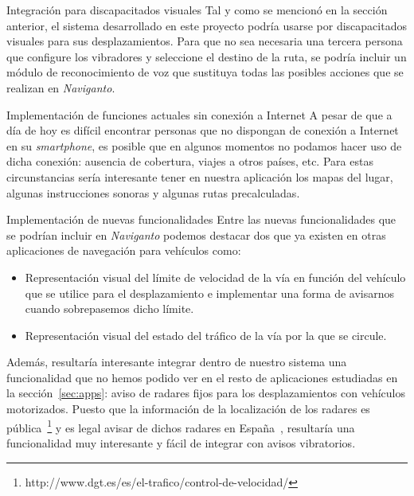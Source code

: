 \begin{definitionlist}
  \item[Integración para discapacitados visuales] Tal y como se mencionó en la sección anterior, el
    sistema desarrollado en este proyecto podría usarse por discapacitados visuales para sus
    desplazamientos. Para que no sea necesaria una tercera persona que configure los vibradores y
    seleccione el destino de la ruta, se podría incluir un módulo de reconocimiento de voz que
    sustituya todas las posibles acciones que se realizan en \emph{Naviganto}.

  \item[Implementación de funciones actuales sin conexión a Internet] A pesar de que a día de hoy es
    difícil encontrar personas que no dispongan de conexión a Internet en su \emph{smartphone}, es
    posible que en algunos momentos no podamos hacer uso de dicha conexión: ausencia de cobertura,
    viajes a otros países, etc. Para estas circunstancias sería interesante tener en nuestra
    aplicación los mapas del lugar, algunas instrucciones sonoras y algunas rutas precalculadas.

  \item[Implementación de nuevas funcionalidades] Entre las nuevas funcionalidades que se podrían
    incluir en \emph{Naviganto} podemos destacar dos que ya existen en otras aplicaciones de
    navegación para vehículos como:

    \begin{itemize}
      \item Representación visual del límite de velocidad de la vía en función del vehículo que se
        utilice para el desplazamiento e implementar una forma de avisarnos cuando sobrepasemos
        dicho límite.
      \item Representación visual del estado del tráfico de la vía por la que se circule.
    \end{itemize}

    Además, resultaría interesante integrar dentro de nuestro sistema una funcionalidad que no hemos
    podido ver en el resto de aplicaciones estudiadas en la sección~\ref{sec:apps}: aviso de radares
    fijos para los desplazamientos con vehículos motorizados. Puesto que la información de la
    localización de los radares es
    pública~\footnote{http://www.dgt.es/es/el-trafico/control-de-velocidad/} y es legal avisar de
    dichos radares en España~\cite{Arias14}, resultaría una funcionalidad muy interesante y fácil de
    integrar con avisos vibratorios.


\end{definitionlist}
